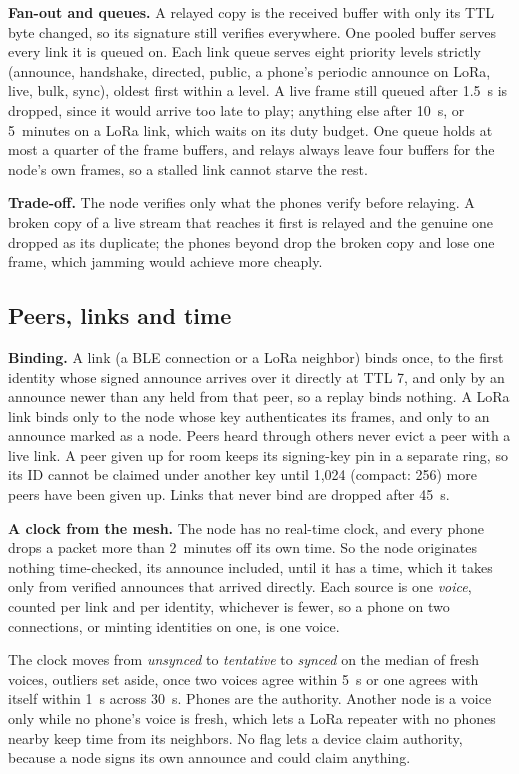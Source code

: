 \documentclass[conference]{IEEEtran}
\begin{document}
\textbf{Fan-out and queues.} A relayed copy is the received buffer with only its TTL byte changed, so its signature still verifies everywhere. One pooled buffer serves every link it is queued on. Each link queue serves eight priority levels strictly (announce, handshake, directed, public, a phone's periodic announce on LoRa, live, bulk, sync), oldest first within a level. A live frame still queued after 1.5~s is dropped, since it would arrive too late to play; anything else after 10~s, or 5~minutes on a LoRa link, which waits on its duty budget. One queue holds at most a quarter of the frame buffers, and relays always leave four buffers for the node's own frames, so a stalled link cannot starve the rest.

\textbf{Trade-off.} The node verifies only what the phones verify before relaying. A broken copy of a live stream that reaches it first is relayed and the genuine one dropped as its duplicate; the phones beyond drop the broken copy and lose one frame, which jamming would achieve more cheaply.

\subsection{Peers, links and time}
\label{sec:time}

\textbf{Binding.} A link (a BLE connection or a LoRa neighbor) binds once, to the first identity whose signed announce arrives over it directly at TTL 7, and only by an announce newer than any held from that peer, so a replay binds nothing. A LoRa link binds only to the node whose key authenticates its frames, and only to an announce marked as a node. Peers heard through others never evict a peer with a live link. A peer given up for room keeps its signing-key pin in a separate ring, so its ID cannot be claimed under another key until 1,024 (compact: 256) more peers have been given up. Links that never bind are dropped after 45~s.

\textbf{A clock from the mesh.} The node has no real-time clock, and every phone drops a packet more than 2~minutes off its own time. So the node originates nothing time-checked, its announce included, until it has a time, which it takes only from verified announces that arrived directly. Each source is one \emph{voice}, counted per link and per identity, whichever is fewer, so a phone on two connections, or minting identities on one, is one voice.

The clock moves from \emph{unsynced} to \emph{tentative} to \emph{synced} on the median of fresh voices, outliers set aside, once two voices agree within 5~s or one agrees with itself within 1~s across 30~s. Phones are the authority. Another node is a voice only while no phone's voice is fresh, which lets a LoRa repeater with no phones nearby keep time from its neighbors. No flag lets a device claim authority, because a node signs its own announce and could claim anything.
\end{document}
